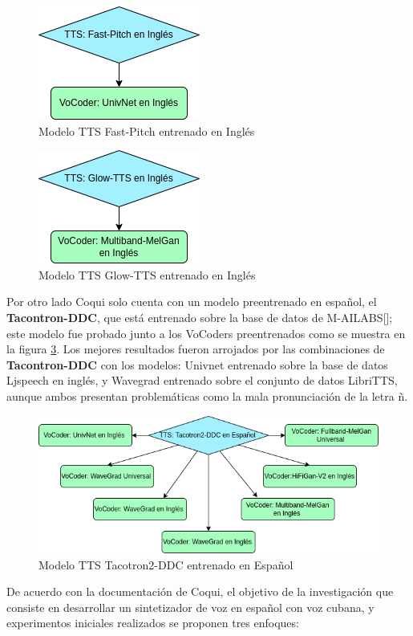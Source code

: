 \begin{figure}[H]
	\centering
	\includegraphics[width=0.3\linewidth]{Graphics/en_fastpitch}
	\caption{Modelo TTS Fast-Pitch entrenado en Inglés}
	\label{en_fastpitch}
\end{figure}
\begin{figure}[H]
	\centering
	\includegraphics[width=0.3\linewidth]{Graphics/en_glowtts}
	\caption{Modelo TTS Glow-TTS entrenado en Inglés}
	\label{en_glowtts}
\end{figure}


Por otro lado Coqui solo cuenta con un modelo preentrenado en español, el \textbf{Tacontron-DDC}, que está entrenado sobre la base de datos de M-AILABS[\cite{mailabs}]; este modelo fue probado junto a los VoCoders preentrenados como se muestra en la figura \ref{es_tacotron}. Los mejores resultados fueron arrojados por las combinaciones de \textbf{Tacontron-DDC} con los modelos: Univnet entrenado sobre la base de datos Ljspeech en inglés, y Wavegrad entrenado sobre el conjunto de datos LibriTTS, aunque ambos presentan problemáticas como la mala pronunciación de la letra ñ.

\begin{figure}[H]
	\centering
	\includegraphics[width=0.8\linewidth]{Graphics/es_tacotron}
	\caption{Modelo TTS Tacotron2-DDC entrenado en Español}
	\label{es_tacotron}
\end{figure}


De acuerdo con la documentación de Coqui, el objetivo de la investigación que consiste en desarrollar un sintetizador de voz en español con voz cubana, y experimentos iniciales realizados se proponen tres enfoques:

